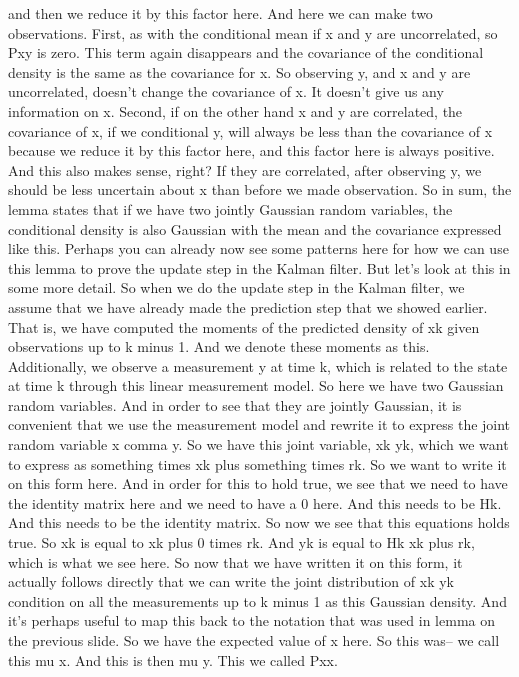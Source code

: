 and then we reduce it by this factor here.
And here we can make two observations.
First, as with the conditional mean
if x and y are uncorrelated, so Pxy is zero.
This term again disappears and the covariance
of the conditional density is the same
as the covariance for x.
So observing y, and x and y are uncorrelated,
doesn't change the covariance of x.
It doesn't give us any information on x.
Second, if on the other hand x and y are correlated,
the covariance of x, if we conditional y,
will always be less than the covariance of x because we
reduce it by this factor here, and this factor here
is always positive.
And this also makes sense, right?
If they are correlated, after observing y,
we should be less uncertain about x than before we
made observation.
So in sum, the lemma states that if we have two jointly Gaussian
random variables, the conditional density is also
Gaussian with the mean and the covariance expressed like this.
Perhaps you can already now see some patterns here
for how we can use this lemma to prove the update
step in the Kalman filter.
But let's look at this in some more detail.
So when we do the update step in the Kalman filter,
we assume that we have already made the prediction
step that we showed earlier.
That is, we have computed the moments
of the predicted density of xk given observations up
to k minus 1.
And we denote these moments as this.
Additionally, we observe a measurement y
at time k, which is related to the state at time k
through this linear measurement model.
So here we have two Gaussian random variables.
And in order to see that they are jointly Gaussian,
it is convenient that we use the measurement model
and rewrite it to express the joint random variable x comma
y.
So we have this joint variable, xk yk,
which we want to express as something times xk
plus something times rk.
So we want to write it on this form here.
And in order for this to hold true,
we see that we need to have the identity matrix here
and we need to have a 0 here.
And this needs to be Hk.
And this needs to be the identity matrix.
So now we see that this equations holds true.
So xk is equal to xk plus 0 times rk.
And yk is equal to Hk xk plus rk, which is what we see here.
So now that we have written it on this form,
it actually follows directly that we
can write the joint distribution of xk yk
condition on all the measurements up to k minus 1
as this Gaussian density.
And it's perhaps useful to map this back
to the notation that was used in lemma on the previous slide.
So we have the expected value of x here.
So this was-- we call this mu x.
And this is then mu y.
This we called Pxx.

